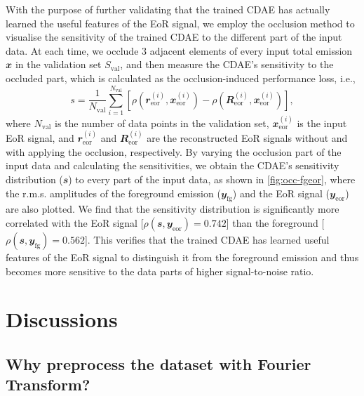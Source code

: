 \documentclass[fleqn,usenatbib]{mnras}
\newcommand{\R}[1]{\mathrm{#1}}
\newcommand{\B}[1]{\mathbfit{#1}}
\begin{document}
{With the purpose of further validating that the trained CDAE has actually
learned the useful features of the EoR signal, we employ the occlusion
method \citep{zeiler2014} to visualise the sensitivity of the trained CDAE
to the different part of the input data.
At each time, we occlude 3 adjacent elements of every input total emission
$\B{x}$ in the validation set $S_{\R{val}}$, and then measure the CDAE's
sensitivity to the occluded part, which is calculated as the
occlusion-induced performance loss, i.e.,
\begin{equation}
  \label{eq:perf-loss}
  s = \frac{1}{N_{\R{val}}} \sum_{i=1}^{N_{\R{val}}}
    \left[ \rho(\B{r}^{(i)}_{\R{eor}}, \B{x}^{(i)}_{\R{eor}}) -
      \rho(\B{R}^{(i)}_{\R{eor}}, \B{x}^{(i)}_{\R{eor}}) \right],
\end{equation}
where
$N_{\R{val}}$ is the number of data points in the validation set,
$\B{x}^{(i)}_{\R{eor}}$ is the input EoR signal, and
$\B{r}^{(i)}_{\R{eor}}$ and $\B{R}^{(i)}_{\R{eor}}$ are the reconstructed
EoR signals without and with applying the occlusion, respectively.
By varying the occlusion part of the input data and calculating the
sensitivities, we obtain the CDAE's sensitivity distribution ($\B{s}$) to
every part of the input data, as shown in \autoref{fig:occ-fgeor}, where
the r.m.s\@. amplitudes of the foreground emission ($\B{y}_{\R{fg}}$) and
the EoR signal ($\B{y}_{\R{eor}}$) are also plotted.
We find that the sensitivity distribution is significantly more correlated
with the EoR signal [$\rho(\B{s}, \B{y}_{\R{eor}}) = 0.742$] than the
foreground [$\rho(\B{s}, \B{y}_{\R{fg}}) = 0.562$].
This verifies that the trained CDAE has learned useful features of the EoR
signal to distinguish it from the foreground emission and thus becomes more
sensitive to the data parts of higher signal-to-noise ratio.
} %


\section{Discussions}
\label{sec:discussions}

\subsection{Why preprocess the dataset with Fourier Transform?}
\label{sec:why-ft}
\end{document}
